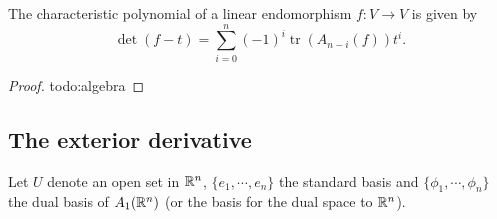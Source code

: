 \begin{theorem}
    The characteristic polynomial of a linear endomorphism $f \colon V \to V$ is given by \[
        \det (f-t)=\sum_{i=0}^{n} (-1)^i \operatorname{tr}\left( A_{n-i}(f) \right) t ^i .
    \] 
\end{theorem}
\begin{proof}
    {\color{red}todo:algebra} 
\end{proof}


\subsection{The exterior derivative}

Let $U$ denote an open set in $\mathbb{R}^n $, $\{e_1,\cdots ,e_n \} $ the standard basis and $\{\phi_1,\cdots ,\phi_n \} $ the dual basis of $A_1(\mathbb{R}^n )$ (or the basis for the dual space to $\mathbb{R}^n $).


